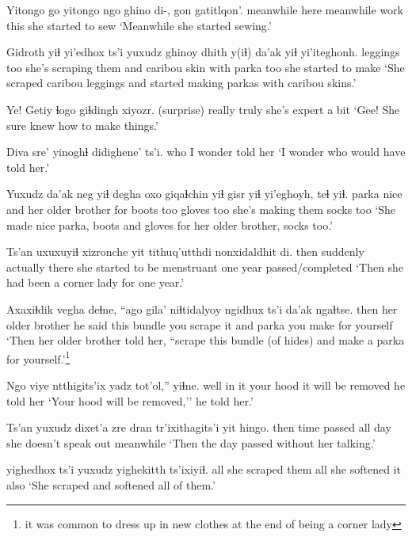 \documentclass[12pt]{article}
\begin{document}
\gll Yitongo   go   yitongo   ngo ghino di-, gon  gatitlqon'.
meanwhile here meanwhile work  {} {}  this {she started to sew}
\glt `Meanwhile she started sewing.'
\glend

\gll Gidroth  yiɬ yi'edhox ts'i yuxudz ghinoy  dhith y(iɬ)  da'ak yiɬ yi'iteghonh.
leggings too {she's scraping them} and {}  caribou skin with parka too {she started to make}
\glt `She scraped caribou leggings and started making parkas with caribou skins.'
\glend

\gll Ye!  Getiy  ɬogo  giɬdingh     xiyozr.
(surprise) really truly {she's expert } {a bit}
\glt `Gee! She sure knew how to make things.'
\glend

\gll Diva sre'     {yinoghɬ didighene'} ts'i.
who  {I wonder} {told her}  {}
\glt `I wonder who would have told her.'
\glend

\gll Yuxudz  da'ak neg  yiɬ degha             oxo giqaɬchin yiɬ gisr   yiɬ yi'eghoyh, teɬ    yiɬ. 
    {}   parka nice and {her older brother} for boots     too gloves too {she's making them} socks too
\glt `She made nice parka, boots and gloves for her older brother, socks too.'
\glend

\gll Ts'an uxuxuyiɬ xizronche yit tithuq'utthdi             {nonxidaldhit} di.
then   suddenly actually there {she started to be menstruant} {one year passed/completed}
\glt `Then she had been a corner lady for one year.'
\glend

\gll Axaxiɬdik vegha             deɬne, ``ago  gila' niɬtidalyoy ngidhux       ts'i da'ak ngaɬtse. 
then      {her older brother} {he said} this  {}   bundle      {you scrape it} and    parka {you make for yourself}
\glt `Then her older brother told her, ``scrape this bundle (of hides) and make a parka for yourself.'\footnote{it was common to dress up in new clothes at the end of being a corner lady}
\glend

\gll Ngo  viye ntthigits'ix {yadz tot'ol},''        yiɬne.
well {in it} {your hood} {it will be removed} {he told her} 
\glt `Your hood will be removed,'' he told her.'
\glend

\gll Ts'an {yuxudz dixet'a}   zre dran tr'ixithagits'i    {yit   hingo.}
then   {time passed} {} {all day} {she doesn't speak out} meanwhile
\glt `Then the day passed without her talking.'
\glend

 yighedhox        ts'i yuxudz yighekitth      ts'ixiyiɬ.
all           {she scraped them} {}     all    {she softened it} also 
\glt `She scraped and softened all of them.'
\glend
\end{document}
